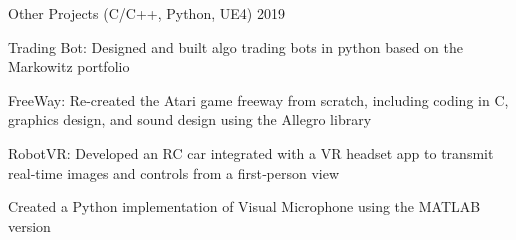 \begin{cventries}
  \cventry
    {Other Projects (C/C++, Python, UE4)} %
    {2019}%
    {}{} 
    {\begin{cvitems}
            \item Trading Bot: Designed and built algo trading bots in python based on the Markowitz portfolio
            \item FreeWay: Re-created the Atari game freeway from scratch, including coding in C, graphics design, and sound design using the Allegro library
            \item RobotVR: Developed an RC car integrated with a VR headset app to transmit real‑time images and controls from a first‑person view 
            \item Created a Python implementation of Visual Microphone using the MATLAB version 
    \end{cvitems}
    }
    
\end{cventries}


